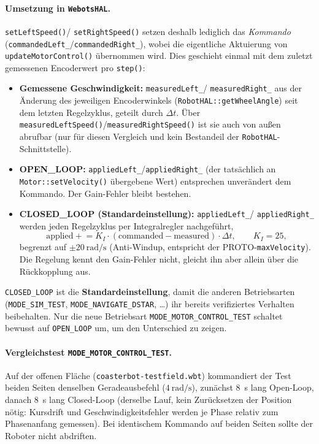 \documentclass[
  a4paper,
  12pt,
  DIV=12,        %
  parskip=half,  %
  headings=small %
]{scrartcl}
\theoremstyle{definition}
\providecommand{\tightlist}{%
  \setlength{\itemsep}{0pt}\setlength{\parskip}{0pt}}
\theoremstyle{definition}
\begin{document}
\paragraph{Umsetzung in \texttt{WebotsHAL}.} \texttt{setLeftSpeed()}/
\texttt{setRightSpeed()} setzen deshalb lediglich das \emph{Kommando}
(\texttt{commandedLeft\_}/\texttt{commandedRight\_}), wobei die eigentliche
Aktuierung von \texttt{updateMotorControl()} übernommen wird. Dies geschieht einmal mit
dem zuletzt gemessenen Encoderwert pro \texttt{step()}:

\begin{itemize}
\tightlist
\item
  \textbf{Gemessene Geschwindigkeit:} \texttt{measuredLeft\_}/
  \texttt{measuredRight\_} aus der Änderung des jeweiligen
  Encoderwinkels (\texttt{RobotHAL::getWheelAngle}) seit dem letzten
  Regelzyklus, geteilt durch $\Delta t$. Über
  \texttt{measuredLeftSpeed()}/\texttt{measuredRightSpeed()} ist sie auch von
  außen abrufbar (nur für diesen Vergleich und kein Bestandeil der
  \texttt{RobotHAL}-Schnittstelle).
\item
  \textbf{OPEN\_LOOP:} \texttt{appliedLeft\_}/\texttt{appliedRight\_}
  (der tatsächlich an \texttt{Motor::setVelocity()} übergebene Wert)
  entsprechen unverändert dem Kommando. Der Gain-Fehler bleibt bestehen.
\item
  \textbf{CLOSED\_LOOP (Standardeinstellung):} \texttt{appliedLeft\_}/
  \texttt{appliedRight\_} werden jeden Regelzyklus per Integralregler
  nachgeführt,
  \[
  \text{applied} \mathrel{+}= K_I \cdot (\text{commanded} - \text{measured}) \cdot \Delta t,
  \qquad K_I = 25,
  \]
  begrenzt auf $\pm\SI{20}{\radian\per\second}$ (Anti-Windup, entspricht
  der PROTO-\texttt{maxVelocity}). Die Regelung kennt den Gain-Fehler
  nicht, gleicht ihn aber allein über die Rückkopplung aus.
\end{itemize}

\texttt{CLOSED\_LOOP} ist die \textbf{Standardeinstellung}, damit
die anderen Betriebsarten (\texttt{MODE\_SIM\_TEST},
\texttt{MODE\_NAVIGATE\_DSTAR}, \ldots) ihr bereits verifiziertes Verhalten
beibehalten. Nur die neue Betriebsart \texttt{MODE\_MOTOR\_CONTROL\_TEST}
schaltet bewusst auf \texttt{OPEN\_LOOP} um, um den Unterschied zu zeigen.

\paragraph{Vergleichstest \texttt{MODE\_MOTOR\_CONTROL\_TEST}.} Auf der
offenen Fläche \linebreak (\texttt{coasterbot-testfield.wbt}) kommandiert der Test
beiden Seiten denselben Geradeausbefehl ($\SI{4}{\radian\per\second}$),
zunächst \SI{8}{\second} lang Open-Loop, danach \SI{8}{\second} lang
Closed-Loop (derselbe Lauf, kein Zurücksetzen der Position nötig: Kursdrift
und Geschwindigkeitsfehler werden je Phase relativ zum Phasenanfang
gemessen). Bei identischem Kommando auf beiden Seiten sollte der Roboter
nicht abdriften.
\end{document}
